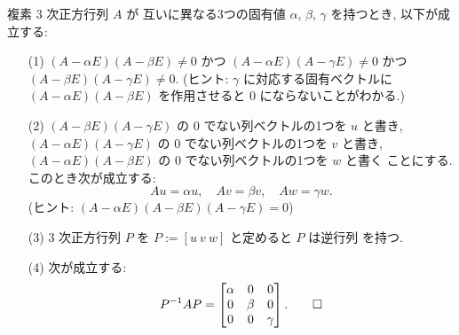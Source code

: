 \documentclass[12pt,twoside]{jarticle}
\begin{document}
\begin{question}\label{q:normal-form-3.1}
  複素 $3$ 次正方行列 $A$ が
  互いに異なる3つの固有値 $\alpha$, $\beta$, $\gamma$ を持つとき, 
  以下が成立する:
  \begin{enumerate}
  \item[(1)] 
    $(A - \alpha E)(A - \beta E) \ne 0$ 
    かつ $(A - \alpha E)(A - \gamma E) \ne 0$ 
    かつ $(A - \beta E)(A - \gamma E) \ne 0$.
    (ヒント: $\gamma$ に対応する固有ベクトルに $(A - \alpha E)(A - \beta E)$ 
    を作用させると $0$ にならないことがわかる.)
  \item[(2)] 
    $(A - \beta E)(A - \gamma E)$ の $0$ でない列ベクトルの1つを $u$ と書き,
    $(A - \alpha E)(A - \gamma E)$ の $0$ でない列ベクトルの1つを $v$ と書き,
    $(A - \alpha E)(A - \beta E)$ の $0$ でない列ベクトルの1つを $w$ と書く
    ことにする.  このとき次が成立する:
    \begin{equation*}
      Au = \alpha u,  \quad  Av = \beta v, \quad Aw = \gamma w.
    \end{equation*}
    (ヒント: $(A-\alpha E)(A-\beta E)(A-\gamma E)=0$)
  \item[(3)] $3$ 次正方行列 $P$ を $P := [u\ v\ w]$ と定めると $P$ は逆行列
    を持つ. 
  \item[(4)] 次が成立する:
    \begin{equation*}
      P^{-1} A P 
      = 
      \begin{bmatrix}
        \alpha & 0 & 0 \\
        0 & \beta & 0 \\
        0 & 0 & \gamma \\
      \end{bmatrix}.
      \qed
    \end{equation*}
  \end{enumerate}
\end{question}

\end{document}
